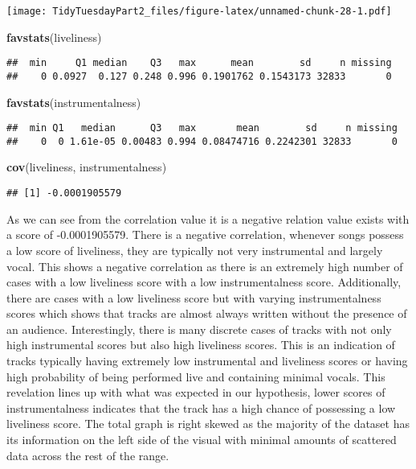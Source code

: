 \documentclass[
]{article}
\newenvironment{Shaded}{\begin{snugshade}}{\end{snugshade}}
\newcommand{\KeywordTok}[1]{\textcolor[rgb]{0.13,0.29,0.53}{\textbf{#1}}}
\newcommand{\NormalTok}[1]{#1}
\begin{document}
\texttt{[image: TidyTuesdayPart2\_files/figure-latex/unnamed-chunk-28-1.pdf]}

\begin{Shaded}
\begin{Highlighting}[]
\KeywordTok{favstats}\NormalTok{(liveliness)}
\end{Highlighting}
\end{Shaded}

\begin{verbatim}
##  min     Q1 median    Q3   max      mean        sd     n missing
##    0 0.0927  0.127 0.248 0.996 0.1901762 0.1543173 32833       0
\end{verbatim}

\begin{Shaded}
\begin{Highlighting}[]
\KeywordTok{favstats}\NormalTok{(instrumentalness)}
\end{Highlighting}
\end{Shaded}

\begin{verbatim}
##  min Q1   median      Q3   max       mean        sd     n missing
##    0  0 1.61e-05 0.00483 0.994 0.08474716 0.2242301 32833       0
\end{verbatim}

\begin{Shaded}
\begin{Highlighting}[]
\KeywordTok{cov}\NormalTok{(liveliness, instrumentalness)}
\end{Highlighting}
\end{Shaded}

\begin{verbatim}
## [1] -0.0001905579
\end{verbatim}

As we can see from the correlation value it is a negative relation value
exists with a score of -0.0001905579. There is a negative correlation,
whenever songs possess a low score of liveliness, they are typically not
very instrumental and largely vocal. This shows a negative correlation
as there is an extremely high number of cases with a low liveliness
score with a low instrumentalness score. Additionally, there are cases
with a low liveliness score but with varying instrumentalness scores
which shows that tracks are almost always written without the presence
of an audience. Interestingly, there is many discrete cases of tracks
with not only high instrumental scores but also high liveliness scores.
This is an indication of tracks typically having extremely low
instrumental and liveliness scores or having high probability of being
performed live and containing minimal vocals. This revelation lines up
with what was expected in our hypothesis, lower scores of
instrumentalness indicates that the track has a high chance of
possessing a low liveliness score. The total graph is right skewed as
the majority of the dataset has its information on the left side of the
visual with minimal amounts of scattered data across the rest of the
range.
\end{document}

